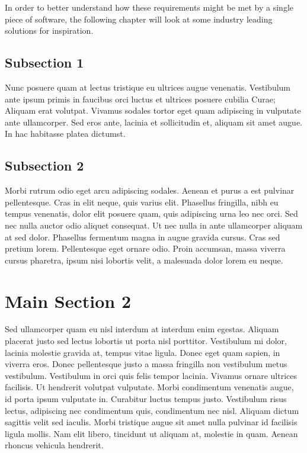 In order to better understand how these requirements might be met by a single
piece of software, the following chapter will look at some industry leading
solutions for inspiration.

\subsection{Subsection 1}

Nunc posuere quam at lectus tristique eu ultrices augue venenatis. Vestibulum ante ipsum primis in faucibus orci luctus et ultrices posuere cubilia Curae; Aliquam erat volutpat. Vivamus sodales tortor eget quam adipiscing in vulputate ante ullamcorper. Sed eros ante, lacinia et sollicitudin et, aliquam sit amet augue. In hac habitasse platea dictumst.


\subsection{Subsection 2}
Morbi rutrum odio eget arcu adipiscing sodales. Aenean et purus a est pulvinar pellentesque. Cras in elit neque, quis varius elit. Phasellus fringilla, nibh eu tempus venenatis, dolor elit posuere quam, quis adipiscing urna leo nec orci. Sed nec nulla auctor odio aliquet consequat. Ut nec nulla in ante ullamcorper aliquam at sed dolor. Phasellus fermentum magna in augue gravida cursus. Cras sed pretium lorem. Pellentesque eget ornare odio. Proin accumsan, massa viverra cursus pharetra, ipsum nisi lobortis velit, a malesuada dolor lorem eu neque.


\section{Main Section 2}

Sed ullamcorper quam eu nisl interdum at interdum enim egestas. Aliquam placerat justo sed lectus lobortis ut porta nisl porttitor. Vestibulum mi dolor, lacinia molestie gravida at, tempus vitae ligula. Donec eget quam sapien, in viverra eros. Donec pellentesque justo a massa fringilla non vestibulum metus vestibulum. Vestibulum in orci quis felis tempor lacinia. Vivamus ornare ultrices facilisis. Ut hendrerit volutpat vulputate. Morbi condimentum venenatis augue, id porta ipsum vulputate in. Curabitur luctus tempus justo. Vestibulum risus lectus, adipiscing nec condimentum quis, condimentum nec nisl. Aliquam dictum sagittis velit sed iaculis. Morbi tristique augue sit amet nulla pulvinar id facilisis ligula mollis. Nam elit libero, tincidunt ut aliquam at, molestie in quam. Aenean rhoncus vehicula hendrerit.
